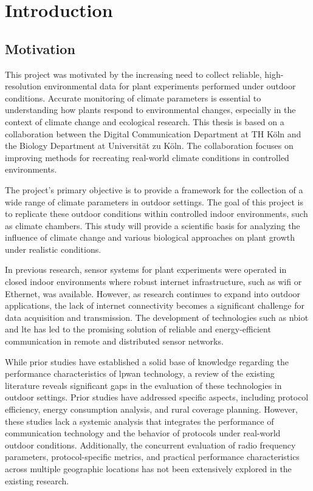 \documentclass[12pt, english, openany]{book}
\begin{document}
\mainmatter

\chapter{Introduction} \label{chap:introduction}
\section{Motivation} \label{sec:motivation}

This project was motivated by the increasing need to collect reliable, high-resolution environmental data for plant experiments performed under outdoor conditions. Accurate monitoring of climate parameters is essential to understanding how plants respond to environmental changes, especially in the context of climate change and ecological research. This thesis is based on a collaboration between the Digital Communication Department at TH Köln and the Biology Department at Universität zu Köln. The collaboration focuses on improving methods for recreating real-world climate conditions in controlled environments.

The project's primary objective is to provide a framework for the collection of a wide range of climate parameters in outdoor settings. The goal of this project is to replicate these outdoor conditions within controlled indoor environments, such as climate chambers. This study will provide a scientific basis for analyzing the influence of climate change and various biological approaches on plant growth under realistic conditions.

In previous research, sensor systems for plant experiments were operated in closed indoor environments where robust internet infrastructure, such as \gls{wifi} or Ethernet, was available. However, as research continues to expand into outdoor applications, the lack of internet connectivity becomes a significant challenge for data acquisition and transmission. The development of technologies such as \gls{nbiot} and \gls{lte} has led to the promising solution of reliable and energy-efficient communication in remote and distributed sensor networks.

While prior studies have established a solid base of knowledge regarding the performance characteristics of \gls{lpwan} technology, a review of the existing literature reveals significant gaps in the evaluation of these technologies in outdoor settings. Prior studies have addressed specific aspects, including protocol efficiency, energy consumption analysis, and rural coverage planning. However, these studies lack a systemic analysis that integrates the performance of communication technology and the behavior of protocols under real-world outdoor conditions. Additionally, the concurrent evaluation of radio frequency parameters, protocol-specific metrics, and practical performance characteristics across multiple geographic locations has not been extensively explored in the existing research.
\end{document}
